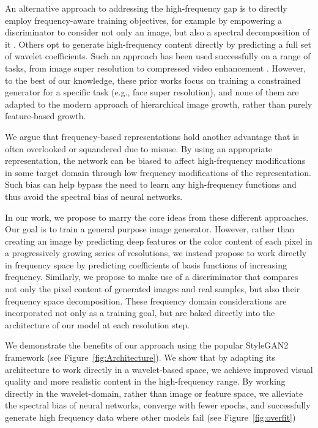 \documentclass[final]{CVPR2021/cvpr}
\begin{document}
An alternative approach to addressing the high-frequency gap is to directly employ frequency-aware training objectives, for example by empowering a discriminator to consider not only an image, but also a spectral decomposition of it \citep{durall2020watch,dzanic2019fourier,chen2020ssd}. Others opt to generate high-frequency content directly by predicting a full set of wavelet coefficients. Such an approach has been used successfully on a range of tasks, from image super resolution \citep{huang2017wavelet, zhang2019image} to compressed video enhancement \citep{wang2020multi}. However, to the best of our knowledge, these prior works focus on training a constrained generator for a specific task (e.g., face super resolution), and none of them are adapted to the modern approach of hierarchical image growth, rather than purely feature-based growth. 

We argue that frequency-based representations hold another advantage that is often overlooked or squandered due to misuse. By using an appropriate representation, the network can be biased to affect high-frequency modifications in some target domain through low frequency modifications of the representation. Such bias can help bypass the need to learn any high-frequency functions and thus avoid the spectral bias of neural networks.

In our work, we propose to marry the core ideas from these different approaches. Our goal is to train a general purpose image generator. However, rather than creating an image by predicting deep features or the color content of each pixel in a progressively growing series of resolutions, we instead propose to work directly in frequency space by predicting coefficients of basis functions of increasing \mbox{frequency}. Similarly, we propose to make use of a \mbox{discriminator} that compares not only the pixel content of generated images and real samples, but also their frequency space decomposition. These frequency domain \mbox{considerations} are incorporated not only as a training goal, but are baked directly into the architecture of our model at each resolution step. 

We demonstrate the benefits of our approach using the popular StyleGAN2 framework \citep{karras2020analyzing} (see Figure~\ref{fig:Architecture}). We show that by adapting its architecture to work directly in a wavelet-based space, we achieve improved visual quality and more realistic content in the high-frequency range. By working directly in the wavelet-domain, rather than \mbox{image} or feature space, we alleviate the spectral bias of \mbox{neural} \mbox{networks}, converge with fewer epochs, and successfully generate high frequency data where other models fail (see Figure~\ref{fig:overfit})
\end{document}
